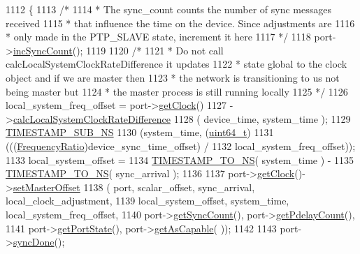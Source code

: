 \begin{DoxyCode}
{{{{{1112     \{
1113         \textcolor{comment}{/*}
1114 \textcolor{comment}{         * The sync\_count counts the number of sync messages received}
1115 \textcolor{comment}{         * that influence the time on the device. Since adjustments are}
1116 \textcolor{comment}{         * only made in the PTP\_SLAVE state, increment it here}
1117 \textcolor{comment}{         */}
1118         port->\hyperlink{class_common_port_adc84a20b20a67b0e1bb87313c7e923fd}{incSyncCount}();
1119 
1120         \textcolor{comment}{/*}
1121 \textcolor{comment}{         * Do not call calcLocalSystemClockRateDifference it updates}
1122 \textcolor{comment}{         * state global to the clock object and if we are master then}
1123 \textcolor{comment}{         * the network is transitioning to us not being master but}
1124 \textcolor{comment}{         * the master process is still running locally}
1125 \textcolor{comment}{         */}
1126         local\_system\_freq\_offset = port->\hyperlink{class_common_port_ab8e59ecfb51ec14e166bc8bfc872b1ef}{getClock}()
1127             ->\hyperlink{class_i_e_e_e1588_clock_af78760f9002bfad5f7494c49907f91b9}{calcLocalSystemClockRateDifference}
1128             ( device\_time, system\_time );
1129         \hyperlink{ieee1588_8hpp_ae4bf4339881295a97a340d4c59b0caa6}{TIMESTAMP\_SUB\_NS}
1130         (system\_time, (\hyperlink{parse_8c_aec6fcb673ff035718c238c8c9d544c47}{uint64\_t})
1131             (((\hyperlink{ptptypes_8hpp_a84de47dc2ed889ecd2b61706d3ad0f2e}{FrequencyRatio})device\_sync\_time\_offset) /
1132                 local\_system\_freq\_offset));
1133         local\_system\_offset =
1134             \hyperlink{ieee1588_8hpp_a0f6cecd8adce4a7314f084f3ead49999}{TIMESTAMP\_TO\_NS}( system\_time ) -
1135             \hyperlink{ieee1588_8hpp_a0f6cecd8adce4a7314f084f3ead49999}{TIMESTAMP\_TO\_NS}( sync\_arrival );
1136 
1137         port->\hyperlink{class_common_port_ab8e59ecfb51ec14e166bc8bfc872b1ef}{getClock}()->\hyperlink{class_i_e_e_e1588_clock_a6e4391235823b250e5dbf6df39b27476}{setMasterOffset}
1138         ( port, scalar\_offset, sync\_arrival, local\_clock\_adjustment,
1139           local\_system\_offset, system\_time, local\_system\_freq\_offset,
1140           port->\hyperlink{class_common_port_ae83aa3b2d155e97810ccccd57e9f13ca}{getSyncCount}(), port->\hyperlink{class_common_port_acb83433716949af5f97d373d8ca6ee8d}{getPdelayCount}(),
1141           port->\hyperlink{class_common_port_aa4182d914fdb9a27fb875d8495e0289c}{getPortState}(), port->\hyperlink{class_common_port_a329f27c73986ce1901d7e1064e2a5af1}{getAsCapable}( ));
1142 
1143         port->\hyperlink{class_common_port_a01d4aad4d75c04bd00ad6ec3973e5c01}{syncDone}();
}}}}}
\end{DoxyCode}
